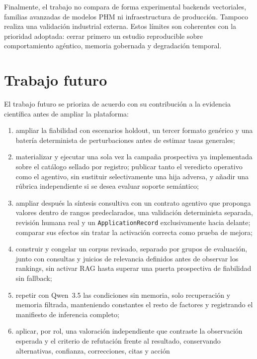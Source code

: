 Finalmente, el trabajo no compara de forma experimental backends vectoriales,
familias avanzadas de modelos PHM ni infraestructura de producción. Tampoco
realiza una validación industrial externa. Estos límites son coherentes con la
prioridad adoptada: cerrar primero un estudio reproducible sobre comportamiento
agéntico, memoria gobernada y degradación temporal.

\section{Trabajo futuro}

El trabajo futuro se prioriza de acuerdo con su contribución a la evidencia
científica antes de ampliar la plataforma:

\begin{enumerate}
  \item ampliar la fiabilidad con escenarios holdout, un tercer formato genérico
        y una batería determinista de perturbaciones antes de estimar tasas
        generales;
  \item materializar y ejecutar una sola vez la campaña prospectiva ya
        implementada sobre el catálogo sellado por registro; publicar tanto el
        veredicto operativo como el agentivo, sin sustituir selectivamente una
        hija adversa, y añadir una rúbrica independiente si se desea evaluar
        soporte semántico;
  \item ampliar después la síntesis consultiva con un contrato agentivo que
        proponga valores dentro de rangos predeclarados, una validación
        determinista separada, revisión humana real y un
        \texttt{ApplicationRecord} exclusivamente hacia delante; comparar sus
        efectos sin tratar la activación correcta como prueba de mejora;
  \item construir y congelar un corpus revisado, separado por grupos de
        evaluación, junto con consultas y juicios de relevancia definidos antes
        de observar los rankings, sin activar RAG hasta superar una puerta
        prospectiva de fiabilidad sin fallback;
  \item repetir con Qwen~3.5 las condiciones sin memoria, solo recuperación y
        memoria filtrada, manteniendo constantes el resto de factores y
        registrando el manifiesto de inferencia completo;
  \item aplicar, por rol, una valoración independiente que contraste la
        observación esperada y el criterio de refutación frente al resultado,
        conservando alternativas, confianza, correcciones, citas y acción

\end{enumerate}

